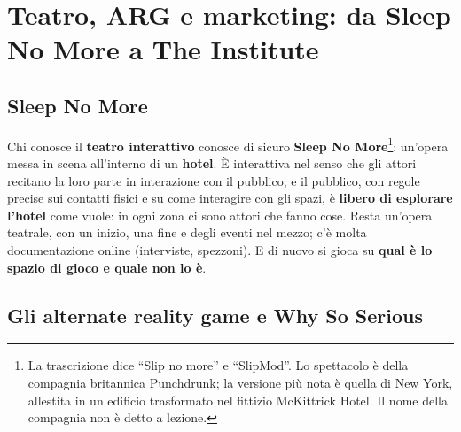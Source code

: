 \section{Teatro, ARG e marketing: da Sleep No More a The Institute}
\label{a2:sec:pervasivi-arg}

\subsection{Sleep No More}



Chi conosce il \textbf{teatro interattivo} conosce di sicuro \textbf{Sleep No
More}\footnote{La trascrizione dice ``Slip no more'' e ``SlipMod''. Lo
spettacolo è della compagnia britannica Punchdrunk; la versione più nota è
quella di New York, allestita in un edificio trasformato nel fittizio McKittrick
Hotel. Il nome della compagnia non è detto a lezione.}: un'opera messa in scena
all'interno di un \textbf{hotel}. È interattiva nel senso che gli attori recitano
la loro parte in interazione con il pubblico, e il pubblico, con regole precise
sui contatti fisici e su come interagire con gli spazi, è \textbf{libero di
esplorare l'hotel} come vuole: in ogni zona ci sono attori che fanno cose. Resta
un'opera teatrale, con un inizio, una fine e degli eventi nel mezzo; c'è molta
documentazione online (interviste, spezzoni). E di nuovo si gioca su
\textbf{qual è lo spazio di gioco e quale non lo è}.

\subsection{Gli alternate reality game e Why So Serious}

